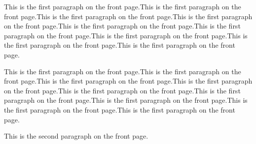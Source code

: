 \documentclass{article}
\begin{document}
This is the first paragraph on the front page.This is the first paragraph on the front page.This is the first paragraph on the front page.This is the first paragraph on the front page.This is the first paragraph on the front page.This is the first paragraph on the front page.This is the first paragraph on the front page.This is the first paragraph on the front page.This is the first paragraph on the front page.\par
This is the first paragraph on the front page.This is the first paragraph on the front page.This is the first paragraph on the front page.This is the first paragraph on the front page.This is the first paragraph on the front page.This is the first paragraph on the front page.This is the first paragraph on the front page.This is the first paragraph on the front page.This is the first paragraph on the front page.\par
This is the second paragraph on the front page.\par

\newpage
\end{document}

